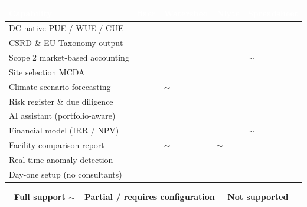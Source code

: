 \documentclass[11pt, a4paper]{article}
\newcommand{\tableheader}[1]{\cellcolor{flaergreen!90}\textcolor{white}{\textbf{\small #1}}}
\newcommand{\greencheck}{\textcolor{flaergreen}{\textbf{\ding{51}}}}
\newcommand{\redcross}{\textcolor{flaerred}{\textbf{\ding{55}}}}
\newcommand{\partmark}{\textcolor{flaeramber}{\textbf{$\sim$}}}
\begin{document}
\begin{tabular}{>{\raggedright\arraybackslash}p{5.2cm}
                 >{\centering\arraybackslash}p{1.5cm}
                 >{\centering\arraybackslash}p{2.1cm}
                 >{\centering\arraybackslash}p{1.7cm}
                 >{\centering\arraybackslash}p{2.4cm}}
  \toprule
  \tableheader{Capability} &
  \tableheader{flaer} &
  \tableheader{Watershed} &
  \tableheader{Nlyte} &
  \tableheader{Spreadsheet} \\
  \midrule
  \rowcolor{rowalt}
  DC-native PUE / WUE / CUE          & \greencheck & \redcross   & \greencheck & \redcross   \\
  CSRD \& EU Taxonomy output          & \greencheck & \redcross   & \redcross   & \redcross   \\
  \rowcolor{rowalt}
  Scope 2 market-based accounting     & \greencheck & \greencheck & \redcross   & \partmark   \\
  Site selection MCDA                 & \greencheck & \redcross   & \redcross   & \redcross   \\
  \rowcolor{rowalt}
  Climate scenario forecasting        & \greencheck & \partmark   & \redcross   & \redcross   \\
  Risk register \& due diligence      & \greencheck & \redcross   & \redcross   & \redcross   \\
  \rowcolor{rowalt}
  AI assistant (portfolio-aware)      & \greencheck & \redcross   & \redcross   & \redcross   \\
  Financial model (IRR / NPV)         & \greencheck & \redcross   & \redcross   & \partmark   \\
  \rowcolor{rowalt}
  Facility comparison report          & \greencheck & \partmark   & \partmark   & \redcross   \\
  Real-time anomaly detection         & \greencheck & \redcross   & \greencheck & \redcross   \\
  \rowcolor{rowalt}
  Day-one setup (no consultants)      & \greencheck & \redcross   & \redcross   & \greencheck \\
  \bottomrule
\end{tabular}

\vspace{0.4cm}
\begin{tcolorbox}[bluebox, left=8pt, right=8pt, top=5pt, bottom=5pt]
\small\bfseries
\greencheck\ \ Full support \qquad
\partmark\ \ Partial / requires configuration \qquad
\redcross\ \ Not supported
\end{tcolorbox}
\end{document}
